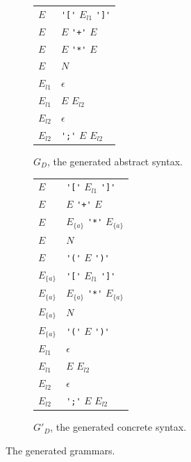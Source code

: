 \documentclass[acmsmall,review,anonymous]{acmart}\settopmatter{printfolios=true,printccs=false,printacmref=false}
\begin{document}
\begin{figure}
  \begin{subfigure}[t]{.45\linewidth}
    \centering
    \begin{tabular}{@{}l@{\quad$->$\quad}l@{}}
      \toprule
      $E$ & \verb|'['| $E_{l1}$ \verb|']'| \\
      $E$ & $E$ \verb|'+'| $E$ \\
      $E$ & $E$ \verb|'*'| $E$ \\
      $E$ & $N$ \\
      \midrule
      $E_{l1}$ & $\epsilon$ \\
      $E_{l1}$ & $E$ $E_{l2}$ \\
      \midrule
      $E_{l2}$ & $\epsilon$ \\
      $E_{l2}$ & \verb|';'| $E$ $E_{l2}$ \\
      \bottomrule
    \end{tabular}
    \caption{$G_D$, the generated abstract syntax.}
    \label{fig:running-example-generated:w}
  \end{subfigure}%
%
  \begin{subfigure}[t]{.45\linewidth}
    \centering
    \begin{tabular}{@{}l@{\quad$->$\quad}l@{}}
      \toprule
      $E$ & \verb|'['| $E_{l1}$ \verb|']'| \\
      $E$ & $E$ \verb|'+'| $E$ \\
      $E$ & $E_{\{a\}}$ \verb|'*'| $E_{\{a\}}$ \\
      $E$ & $N$ \\
      $E$ & \verb|'('| $E$ \verb|')'| \\
      \midrule
      $E_{\{a\}}$ & \verb|'['| $E_{l1}$ \verb|']'| \\
      $E_{\{a\}}$ & $E_{\{a\}}$ \verb|'*'| $E_{\{a\}}$ \\
      $E_{\{a\}}$ & $N$ \\
      $E_{\{a\}}$ & \verb|'('| $E$ \verb|')'| \\
      \midrule
      $E_{l1}$ & $\epsilon$ \\
      $E_{l1}$ & $E$ $E_{l2}$ \\
      \midrule
      $E_{l2}$ & $\epsilon$ \\
      $E_{l2}$ & \verb|';'| $E$ $E_{l2}$ \\
      \bottomrule
    \end{tabular}
    \caption{$G'_D$, the generated concrete syntax.}
    \label{fig:running-example-generated:w-prime}
  \end{subfigure}
  \caption{The generated grammars.}
  \label{fig:running-example-generated}
\end{figure}
\end{document}
